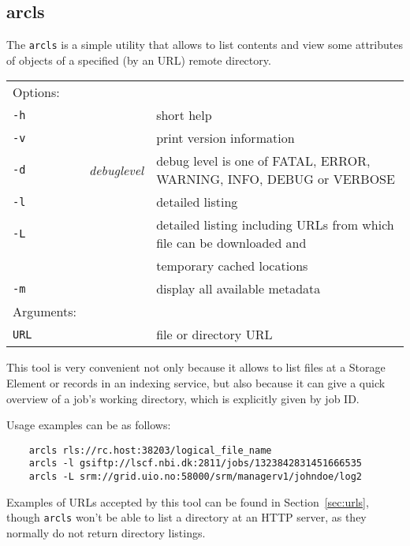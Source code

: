 \subsection{arcls}\label{sec:arcls}
The \texttt{arcls}  is a simple
utility that allows to list contents and view some attributes of
objects of a specified (by an URL) remote directory.

\hspace*{0.5cm}
\begin{shaded}
\end{shaded}
\begin{longtable}{llp{8cm}}
    Options:&&\\
    \texttt{-h} && short help\\
    \texttt{-v} && print version information\\
    \texttt{-d} & \textit{debuglevel} &debug level is one of  FATAL, ERROR, WARNING, INFO, DEBUG or VERBOSE\\
    \texttt{-l} &  & detailed listing\\
    \texttt{-L} &  & detailed listing including URLs from which file can 
    be downloaded and\\ & & temporary cached locations\\
    \texttt{-m} && display all available metadata\\
    Arguments:&&\\
    \texttt{URL} && file or directory URL\\
\end{longtable}

This tool is very convenient not only because it allows to list files
at a Storage Element or records in an indexing service, but also
because it can give a quick overview of a job's working directory,
which is explicitly given by job ID.

Usage examples can be as follows:

\begin{verbatim}
    arcls rls://rc.host:38203/logical_file_name
    arcls -l gsiftp://lscf.nbi.dk:2811/jobs/1323842831451666535
    arcls -L srm://grid.uio.no:58000/srm/managerv1/johndoe/log2
\end{verbatim}

Examples of URLs accepted by this tool can be found in
Section~\ref{sec:urls}, though \texttt{arcls} won't be able to list a
directory at an HTTP server, as they normally do not return directory
listings.


